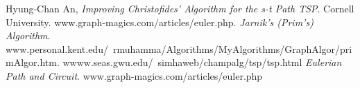 \documentclass[11pt,twocolumn]{article}
\begin{document}
\clearpage

\begin{thebibliography}{9}
  Hyung-Chan An,
  \emph{Improving Christofides' Algorithm for the s-t Path TSP}. 
  Cornell University. www.graph-magics.com/articles/euler.php.
  \emph{Jarnik's (Prim's) Algorithm}. 
  www.personal.kent.edu/~rmuhamma/Algorithms/MyAlgorithms/GraphAlgor/primAlgor.htm.
 wwww.seas.gwu.edu/~simhaweb/champalg/tsp/tsp.html
  \emph{Eulerian Path and Circuit}. 
	www.graph-magics.com/articles/euler.php

\end{thebibliography}
\end{document}
